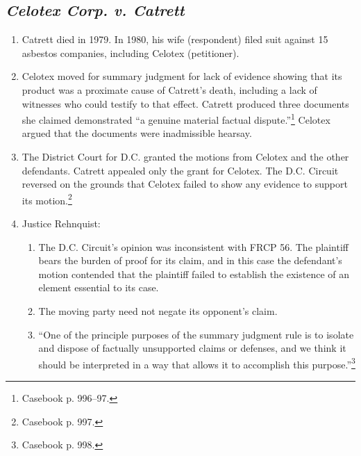 \subsection{\emph{Celotex Corp. v. Catrett}}

\begin{enumerate}
    \item Catrett died in 1979. In 1980, his wife (respondent) filed suit 
    against 15 asbestos companies, including Celotex (petitioner).
    \item Celotex moved for summary judgment for lack of evidence showing that 
    its product was a proximate cause of Catrett's death, including a lack of 
    witnesses who could testify to that effect. Catrett produced three 
    documents she claimed demonstrated ``a genuine material factual 
    dispute.''\footnote{Casebook p. 996--97.} Celotex argued that the 
    documents were inadmissible hearsay.
    \item The District Court for D.C. granted the motions from Celotex and the 
    other defendants. Catrett appealed only the grant for Celotex. The D.C. 
    Circuit reversed on the grounds that Celotex failed to show any evidence 
    to support its motion.\footnote{Casebook p. 997.}
    \item Justice Rehnquist:
    \begin{enumerate}
        \item The D.C. Circuit's opinion was inconsistent with FRCP 56. The 
        plaintiff bears the burden of proof for its claim, and in this case 
        the defendant's motion contended that the plaintiff failed to 
        establish the existence of an element essential to its case.
        \item The moving party need not negate its opponent's claim.
        \item ``One of the principle purposes of the summary judgment rule is 
        to isolate and dispose of factually unsupported claims or defenses, 
        and we think it should be interpreted in a way that allows it to 
        accomplish this purpose.''\footnote{Casebook p. 998.}

    \end{enumerate}
\end{enumerate}

% 
% 
% 
